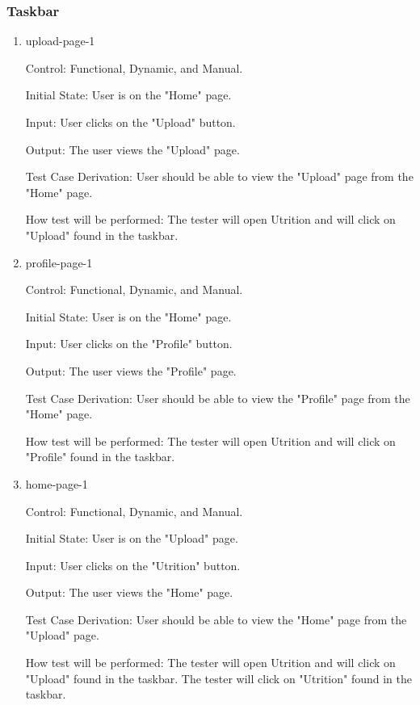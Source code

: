\documentclass[12pt, titlepage]{article}
\begin{document}
	\subsubsection{Taskbar}
	\begin{enumerate}
		\item{upload-page-1\\}
		
		Control: Functional, Dynamic, and Manual.
		
		Initial State: User is on the "Home" page.
		
		Input: User clicks on the "Upload" button.
		
		Output: The user views the "Upload" page.
		
		Test Case Derivation: User should be able to view the "Upload" page from the "Home" page.
		
		How test will be performed: The tester will open Utrition and will click on "Upload" found in the taskbar.
		
		\item{profile-page-1\\}
		
		Control: Functional, Dynamic, and Manual.
		
		Initial State: User is on the "Home" page.
		
		Input: User clicks on the "Profile" button.
		
		Output: The user views the "Profile" page.
		
		Test Case Derivation: User should be able to view the "Profile" page from the "Home" page.
		
		How test will be performed: The tester will open Utrition and will click on "Profile" found in the taskbar.
		
		\item{home-page-1\\}
		
		Control: Functional, Dynamic, and Manual.
		
		Initial State: User is on the "Upload" page.
		
		Input: User clicks on the "Utrition" button.
		
		Output: The user views the "Home" page.
		
		Test Case Derivation: User should be able to view the "Home" page from the "Upload" page.
		
		How test will be performed: The tester will open Utrition and will click on "Upload" found in the taskbar. The tester will click on "Utrition" found in the taskbar.
		

\end{enumerate}
\end{document}
